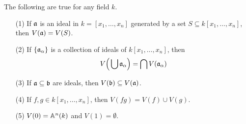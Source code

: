 \begin{lemma}\label{1.2.1}
    The following are true for any field $k$.
    \begin{enumerate}
        \item[(1)] If $\mathfrak{a}$ is an ideal in $k=[x_1, \dots, x_n]$ generated by a
            set $S \subseteq k[x_1, \dots, x_n]$, then $V(\mathfrak{a})=V(S)$.

        \item[(2)] If $\{\mathfrak{a}_\alpha\}$ is a collection of ideals of $k[x_1, \dots,
            x_n]$, then
            \begin{equation*}
                V\Big{(} \bigcup{\mathfrak{a}_\alpha} \Big{)}=\bigcap{V(\mathfrak{a}_\alpha)}
            \end{equation*}

        \item[(3)] If $\mathfrak{a} \subseteq \mathfrak{b}$ are ideals, then  $V(\mathfrak{b}) \subseteq
            V(\mathfrak{a})$.

        \item[(4)] If $f,g \in k[x_1, \dots, x_n]$, then $V(fg)=V(f) \cup V(g)$.

        \item[(5)] $V(0)=\mathbb{A}^n(k)$ and $V(1)=\emptyset$.
    \end{enumerate}
\end{lemma}
